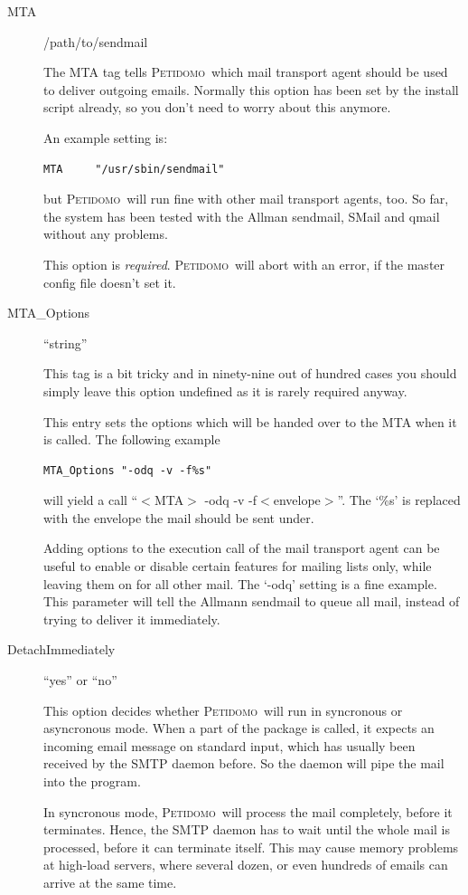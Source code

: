 \documentclass[a4paper,10pt]{scrreprt}
\newcommand{\Petidomo}{{\scshape Peti\-domo}}
\newcommand{\file}[1]{{\sf #1}}
\begin{document}
\begin{description}
\item[MTA] \hfill \file{/path/to/sendmail}

The MTA tag tells \Petidomo\ which mail transport agent should be used
to deliver outgoing emails. Normally this option has been set by the
install script already, so you don't need to worry about this anymore.

An example setting is:
\begin{verbatim}
MTA     "/usr/sbin/sendmail"
\end{verbatim}
but \Petidomo\ will run fine with other mail transport agents, too. So
far, the system has been tested with the Allman sendmail, SMail and
qmail without any problems.

This option is \emph{required}. \Petidomo\ will abort with an error,
if the master config file doesn't set it.


\item[MTA\_Options] \hfill ``string''

This tag is a bit tricky and in ninety-nine out of hundred cases you
should simply leave this option undefined as it is rarely required
anyway.

This entry sets the options which will be handed over to the MTA
when it is called. The following example
\begin{verbatim}
MTA_Options "-odq -v -f%s"
\end{verbatim}
will yield a call ``$<$MTA$>$ -odq -v -f$<$envelope$>$''. The `\%s' is
replaced with the envelope the mail should be sent under.

Adding options to the execution call of the mail transport agent can
be useful to enable or disable certain features for mailing lists
only, while leaving them on for all other mail. The `-odq' setting is
a fine example. This parameter will tell the Allmann sendmail to queue
all mail, instead of trying to deliver it immediately.

\item[DetachImmediately] \hfill ``yes'' or ``no''

This option decides whether \Petidomo\ will run in syncronous or
asyncronous mode. When a part of the package is called, it expects an
incoming email message on standard input, which has usually been
received by the SMTP daemon before. So the daemon will pipe the mail
into the program.

In syncronous mode, \Petidomo\ will process the mail completely, before
it terminates. Hence, the SMTP daemon has to wait until the whole mail
is processed, before it can terminate itself. This may cause memory
problems at high-load servers, where several dozen, or even hundreds
of emails can arrive at the same time.


\end{description}
\end{document}
